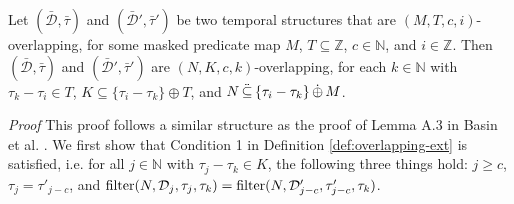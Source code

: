 \begin{lemma}
    \label{lem:eri-overlap-transitivity}
    Let $(\bar{\mathcal{D}}, \bar{\tau})$
        and
        $(\bar{\mathcal{D}}', \bar{\tau}')$ be two temporal structures that are $(M,T,c,i)$-overlapping,
            for some masked predicate map $M$,
            $T \subseteq \mathbb{Z}$,
            $c \in \mathbb{N}$,
            and $i \in \mathbb{Z}$.
    Then $(\bar{\mathcal{D}}, \bar{\tau})$ and $(\bar{\mathcal{D}}', \bar{\tau}')$
    are $(N, K, c, k)$-overlapping,
        for each $k \in \mathbb{N}$
        with $\tau_k - \tau_i \in T$, $K \subseteq \{ \tau_i - \tau_k \} \oplus T$,
        and $N \,\ddot{\subseteq}\, \{ \tau_i - \tau_k \} \,\dot{\oplus}\, M$.
\end{lemma}
\textit{Proof} 
This proof follows a similar structure as the proof of Lemma A.3 in Basin et al. \cite{Basin2016}.
We first show that Condition 1 in Definition \ref{def:overlapping-ext} is satisfied, i.e.
for all $j \in \mathbb{N}$ with $\tau_j - \tau_k \in K$,
the following three things hold:
$j \geq c$,
$\tau_j = \tau'_{j-c}$,
and
$ \operatorname{filter}(N, \mathcal{D}_j, \tau_j, \tau_k) = \operatorname{filter}(N, \mathcal{D}'_{j-c}, \tau'_{j-c}, \tau_k)$.

